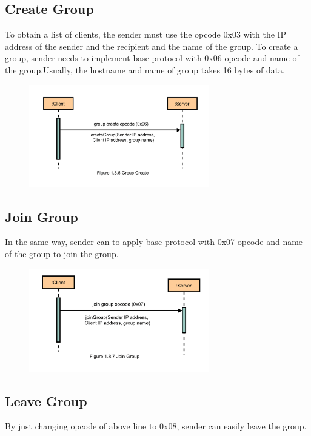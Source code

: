     \subsection{Create Group}\label{subsec:create}
	To obtain a list of clients, the sender must use the opcode 0x03 with the IP address of the sender
	and the recipient and the name of the group.
	To create a group, sender needs to implement base protocol with 0x06 opcode and name
	of the group.Usually, the hostname and name of group takes 16 bytes of data.
	
			\begin{figure}
				\centering
				\includegraphics[width=0.7\textwidth]{gfx/1.8.6_Group_Create}
				\label{fig:group-create}
			\end{figure}

    \subsection{Join Group}\label{subsec:join}
	In the same way, sender can to apply  base protocol with 0x07 opcode and name
	of the group to join the group.
	
			\begin{figure}
				\centering
				\includegraphics[width=0.7\textwidth]{gfx/1.8.7_Join_Group}
				\label{fig:join-group}
			\end{figure}

    \subsection{Leave Group}\label{subsec:leave}
	By just changing opcode of above line to 0x08, sender can easily leave the group.
	
